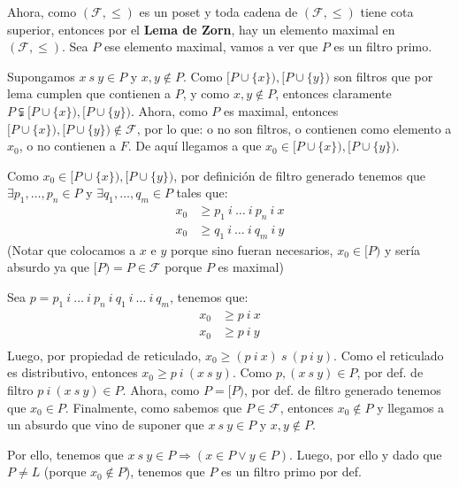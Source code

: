 \documentclass{article}
\begin{document}
Ahora, como $(\mathcal{F},\leq)$ es un poset y toda cadena de $(\mathcal{F},\leq)$ tiene cota superior, entonces por el \textbf{Lema de Zorn}, hay un elemento maximal en $(\mathcal{F},\leq)$. Sea $P$ ese elemento maximal, vamos a ver que $P$ es un filtro primo.

Supongamos $x\ s\ y\in P$ y $x,y\notin P$. Como $[P\cup\{x\}),[P\cup\{y\})$ son filtros que por lema cumplen que contienen a $P$, y como $x,y\notin P$, entonces claramente $P\subsetneqq [P\cup\{x\}),[P\cup\{y\})$. Ahora, como $P$ es maximal, entonces $[P\cup\{x\}),[P\cup\{y\})\notin\mathcal{F}$, por lo que: o no son filtros, o contienen como elemento a $x_0$, o no contienen a $F$. De aquí llegamos a que $x_0\in [P\cup\{x\}),[P\cup\{y\})$.

Como $x_0\in[P\cup\{x\}),[P\cup\{y\})$, por definición de filtro generado tenemos que $\exists p_1,\dots,p_n\in P$ y $\exists q_1,\dots,q_m\in P$ tales que:
\begin{equation*}
  \begin{aligned}
    x_0 & \geq p_1\ i\ \dots\ i\ p_n\ i\ x \\
    x_0 & \geq q_1\ i\ \dots\ i\ q_m\ i\ y
  \end{aligned}
\end{equation*}
(Notar que colocamos a $x$ e $y$ porque sino fueran necesarios, $x_0\in [P)$ y sería absurdo ya que $[P)=P\in\mathcal{F}$ porque $P$ es maximal)

Sea $p=p_1\ i\ \dots\ i\ p_n\ i\ q_1\ i\ \dots\ i\ q_m$, tenemos que:
\begin{equation*}
  \begin{aligned}
    x_0 & \geq p\ i\ x \\
    x_0 & \geq p\ i\ y \\
  \end{aligned}
\end{equation*}
Luego, por propiedad de reticulado, $x_0\geq (p\ i\ x)\ s\ (p\ i\ y)$. Como el reticulado es distributivo, entonces $x_0\geq p\ i\ (x\ s\ y)$. Como $p,(x\ s\ y)\in P$, por def. de filtro $p\ i\ (x\ s\ y)\in P$. Ahora, como $P=[P)$, por def. de filtro generado tenemos que $x_0\in P$. Finalmente, como sabemos que $P\in\mathcal{F}$, entonces $x_0\notin P$ y llegamos a un absurdo que vino de suponer que $x\ s\ y\in P$ y $x,y\notin P$.

Por ello, tenemos que $x\ s\ y\in P\Rightarrow(x\in P\lor y\in P)$. Luego, por ello y dado que $P\neq L$ (porque $x_0\notin P$), tenemos que $P$ es un filtro primo por def.
\end{document}
